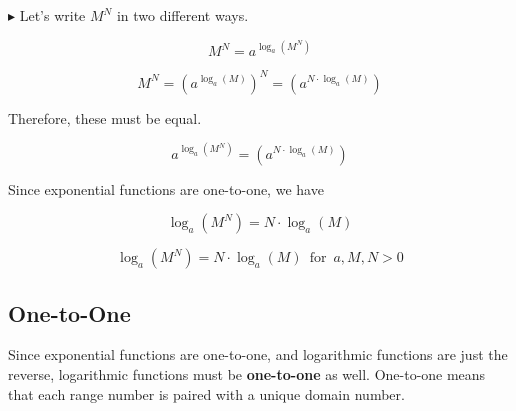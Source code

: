 \documentclass{ximera}
\begin{document}
$\blacktriangleright$  Let's write $M^N$ in two different ways.



\[   M^N = a^{\log_a(M^N)}                  \]

\[   M^N = (a^{\log_a(M)})^N =     (a^{N \cdot \log_a(M)})             \]


Therefore, these must be equal.


\[    a^{\log_a(M^N)}      =    (a^{N \cdot \log_a(M)})                \]





Since exponential functions are one-to-one, we have 


\[    \log_a(M^N)    =   N \cdot \log_a(M)            \]








\begin{template} 

\[    \log_a(M^N)    =   N \cdot \log_a(M)       \, \text{ for } \, a, M, N  > 0        \]


\end{template}


















\subsection*{One-to-One}







Since exponential functions are one-to-one, and logarithmic functions are just the reverse, logarithmic functions must be \textbf{one-to-one} as well. One-to-one means that each range number is paired with a unique domain number.
\end{document}
